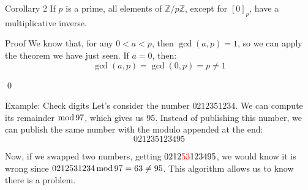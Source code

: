\documentclass[a4paper]{article}
\begin{document}
\begin{parag}{Corollary 2}
    If $p$ is a prime, all elements of $\mathbb{Z} / p\mathbb{Z}$, except for $\left[0\right]_p$, have a multiplicative inverse.

    \begin{subparag}{Proof}
        We know that, for any $0 < a < p$, then $\gcd\left(a, p\right) = 1$, so we can apply the theorem we have just seen. If $a = 0$, then:
        \[\gcd\left(a, p\right) = \gcd\left(0, p\right) = p \neq 1\]

        \qed
    \end{subparag}
\end{parag}

\begin{parag}{Example: Check digits}
    Let's consider the number $0212351234$. We can compute its remainder $\operatorname{mod} 97$, which gives us 95. Instead of publishing this number, we can publish the same number with the modulo appended at the end: 
    \[021235123495\]
    
    Now, if we swapped two numbers, getting $0212{\color{red}53}123495$, we would know it is wrong since $0212531234 \operatorname{mod} 97 = 63 \neq 95$. This algorithm allows us to know there is a problem.
\end{parag}
\end{document}
